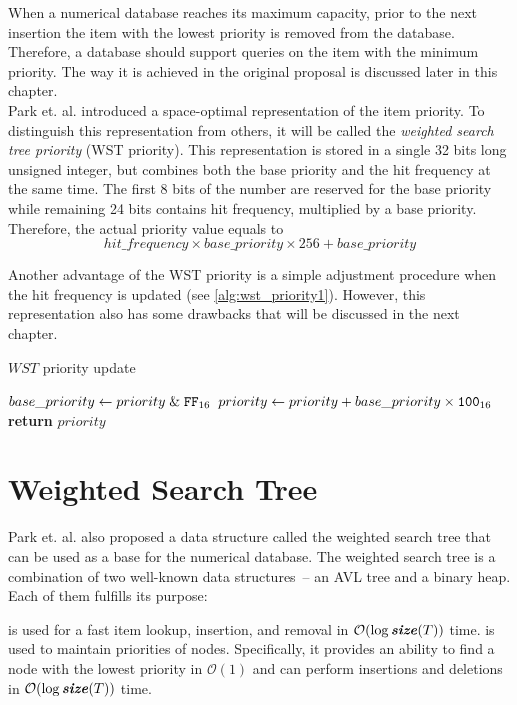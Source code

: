When a numerical database reaches its maximum capacity, prior to the next insertion the item with the lowest priority is removed from the database. Therefore, a database should support queries on the item with the minimum priority. The way it is achieved in the original proposal is discussed later in this chapter.
\\

Park et. al. introduced a space-optimal representation of the item priority. To distinguish this representation from others, it will be called the \emph{weighted search tree priority} (WST priority). This representation is stored in a single 32 bits long unsigned integer, but combines both the base priority and the hit frequency at the same time. The first 8 bits of the number are reserved for the base priority while remaining 24 bits contains hit frequency, multiplied by a base priority.
Therefore, the actual priority value equals to
\begin{equation}
hit\_frequency \times base\_priority \times 256 + base\_priority
\end{equation}

Another advantage of the WST priority is a simple adjustment procedure when the hit frequency is updated (see \cref{alg:wst_priority1}). However, this representation also has some drawbacks that will be discussed in the next chapter.
\begin{algorithm}
\caption{$WST$ priority update}\label{alg:wst_priority1}
\begin{algorithmic}[1]
    \State $base\_priority\gets priority \mathrel{\&} \texttt{FF}_{16}$
    \State $priority \gets priority + base\_priority \times \texttt{100}_{16}$
    \State {}
    \State \textbf{return} $priority$
  \EndProcedure
\end{algorithmic}
\end{algorithm}

\section{Weighted Search Tree}

Park et. al. also proposed a data structure called the weighted search tree that can be used as a base for the numerical database. The weighted search tree is a combination of two well-known data structures~-- an AVL tree and a binary heap. Each of them fulfills its purpose:
\begin{block-description}
 is used for a fast item lookup, insertion, and removal in $\mathcal{O}(\log{\ensuremath{\textbf{\textit{size}}(T)}})$ time.
 is used to maintain priorities of nodes. Specifically, it provides an ability to find a node with the lowest priority in $\mathcal{O}(1)$ and can perform insertions and deletions in $\mathcal{O}(\log{\ensuremath{\textbf{\textit{size}}(T)}})$ time.
\end{block-description}

